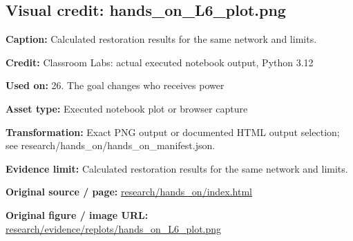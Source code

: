 \documentclass[10pt,letterpaper]{article}
\begin{document}
\subsection*{Visual credit: hands\_on\_L6\_plot.png}
\textbf{Caption:} Calculated restoration results for the same network and limits.\par
\textbf{Credit:} Classroom Labs: actual executed notebook output, Python 3.12\par
\textbf{Used on:} 26. The goal changes who receives power\par
\textbf{Asset type:} Executed notebook plot or browser capture\par
\textbf{Transformation:} Exact PNG output or documented HTML output selection; see research/hands\_on/hands\_on\_manifest.json.\par
\textbf{Evidence limit:} Calculated restoration results for the same network and limits.\par
\textbf{Original source / page:} \href{../research/hands_on/index.html}{\small\ttfamily research/\allowbreak{}hands\_\allowbreak{}on/\allowbreak{}index.\allowbreak{}html}\par
\textbf{Original figure / image URL:} \href{../research/evidence/replots/hands_on_L6_plot.png}{\small\ttfamily research/\allowbreak{}evidence/\allowbreak{}replots/\allowbreak{}hands\_\allowbreak{}on\_\allowbreak{}L6\_\allowbreak{}plot.\allowbreak{}png}\par
\par\medskip
\end{document}
